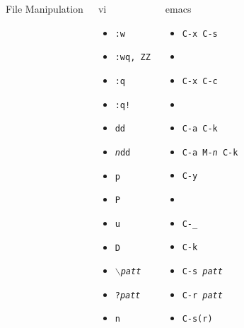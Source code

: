 \documentclass[10pt,t]{beamer}
\begin{document}
\begin{frame}[allowframebreaks]
{\begin{columns}
\begin{exampleblock}{File Manipulation}
\begin{itemize}
    \end{itemize}
    \end{exampleblock}
     \vspace{-0.5cm}
    \begin{exampleblock}{vi}
    \begin{itemize}
      \item \texttt{:w}
      \item \texttt{:wq, ZZ}
      \item \texttt{:q}
      \item \texttt{:q!}
      \item \texttt{dd}
      \item \texttt{\textit{n}dd}
      \item \texttt{p}
      \item \texttt{P}
      \item \texttt{u}
      \item \texttt{D}
      \item \texttt{$\backslash$\textit{patt}}
      \item \texttt{?\textit{patt}}
      \item \texttt{n}
    \end{itemize}
    \end{exampleblock}
     \vspace{-0.5cm}
    \begin{exampleblock}{emacs}
    \begin{itemize}
      \item \texttt{C-x C-s}
      \item \texttt{}
      \item \texttt{C-x C-c}
      \item \texttt{}
      \item \texttt{C-a C-k}
      \item \texttt{C-a M-\textit{n} C-k}
      \item \texttt{C-y}
      \item
      \item \texttt{C-\_}
      \item \texttt{C-k}
      \item \texttt{C-s \textit{patt}}
      \item \texttt{C-r \textit{patt}}
      \item \texttt{C-s(r)}
    \end{itemize}
    \end{exampleblock}
  \end{columns}
}
\end{frame}
\end{document}
